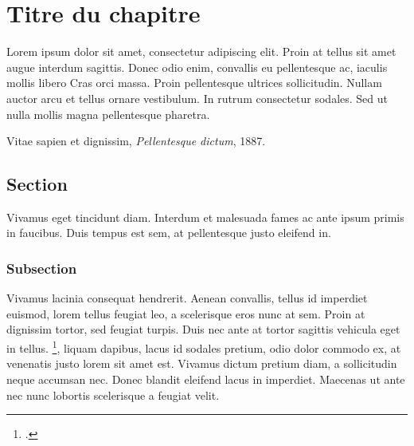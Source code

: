 
\setcounter{mypara}{0}

\makeglossaries



\setcounter{secnumdepth}{4}

{

\sloppy


\nobibliography*
\setcounter{tocdepth}{4}
\setcounter{secnumdepth}{4}

\tableofcontents

\flushbottom 
{} 
\chapter{Titre du chapitre}
\flushbottom 
{}

\og Lorem ipsum dolor sit amet, consectetur adipiscing elit. Proin at tellus sit amet augue interdum sagittis. Donec odio enim, convallis eu pellentesque ac, iaculis mollis libero \gls{Cras orci massa}. Proin pellentesque ultrices sollicitudin. Nullam auctor arcu et tellus ornare vestibulum. In rutrum consectetur sodales. Sed ut nulla mollis magna pellentesque pharetra.\fg\par
\textemdash Vitae sapien et dignissim, \emph{Pellentesque dictum}, 1887.\par

\section{Section}

Vivamus eget tincidunt diam. Interdum et malesuada fames ac ante ipsum primis in faucibus. Duis tempus est sem, at pellentesque justo eleifend in.\par

\subsection{Subsection}

Vivamus lacinia consequat hendrerit. Aenean convallis, tellus id imperdiet euismod, lorem tellus feugiat leo, a scelerisque eros nunc at sem. Proin at dignissim tortor, sed feugiat turpis. Duis nec ante at tortor sagittis vehicula eget in tellus. \footnote{.}, liquam dapibus, lacus id sodales pretium, odio dolor commodo ex, at venenatis justo lorem sit amet est. Vivamus dictum pretium diam, a sollicitudin neque accumsan nec. Donec blandit eleifend lacus in imperdiet. Maecenas ut ante nec nunc lobortis scelerisque a feugiat velit.\par
	
}
